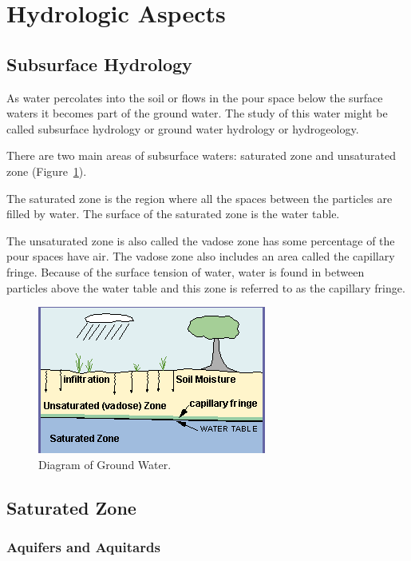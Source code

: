 \documentclass{book}\usepackage{knitr}
\begin{document}
\section{Hydrologic Aspects}

\subsection{Subsurface Hydrology}

As water percolates into the soil or flows in the pour space below the surface waters it becomes part of the ground water. The study of this water might be called subsurface hydrology or ground water hydrology or hydrogeology. 

There are two main areas of subsurface waters: saturated zone and unsaturated zone (Figure~\ref{fig:groundwater}).

The saturated zone is the region where all the spaces between the particles are filled by water. The surface of the saturated zone is the water table. 

The unsaturated zone is also called the vadose zone has some percentage of the pour spaces have air. The vadose zone also includes an area called the capillary fringe. Because of the surface tension of water, water is found in between particles above the water table and this zone is referred to as the capillary fringe. 

\begin{figure}
\includegraphics{images/critical-zone/groundwater}
\caption{Diagram of Ground Water. }
\label{fig:groundwater}
\end{figure}

\subsection{Saturated Zone}

\subsubsection{Aquifers and Aquitards}
\end{document}
